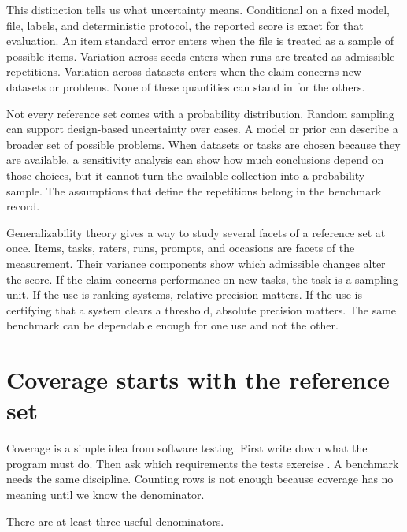 \documentclass[11pt]{article}
\begin{document}
This distinction tells us what uncertainty means. Conditional on a fixed model, file, labels, and deterministic protocol, the reported score is exact for that evaluation. An item standard error enters when the file is treated as a sample of possible items. Variation across seeds enters when runs are treated as admissible repetitions. Variation across datasets enters when the claim concerns new datasets or problems. None of these quantities can stand in for the others.

Not every reference set comes with a probability distribution. Random sampling can support design-based uncertainty over cases. A model or prior can describe a broader set of possible problems. When datasets or tasks are chosen because they are available, a sensitivity analysis can show how much conclusions depend on those choices, but it cannot turn the available collection into a probability sample. The assumptions that define the repetitions belong in the benchmark record.

Generalizability theory gives a way to study several facets of a reference set at once. Items, tasks, raters, runs, prompts, and occasions are facets of the measurement. Their variance components show which admissible changes alter the score. If the claim concerns performance on new tasks, the task is a sampling unit. If the use is ranking systems, relative precision matters. If the use is certifying that a system clears a threshold, absolute precision matters. The same benchmark can be dependable enough for one use and not the other.

\section*{Coverage starts with the reference set}

Coverage is a simple idea from software testing. First write down what the program must do. Then ask which requirements the tests exercise \citep{ammann2016softwaretesting}. A benchmark needs the same discipline. Counting rows is not enough because coverage has no meaning until we know the denominator.

There are at least three useful denominators.
\end{document}

